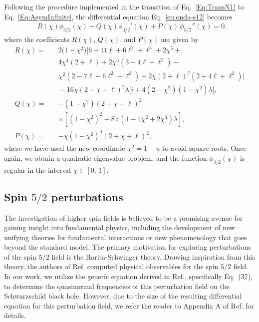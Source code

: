 Following the procedure implemented in the transition of Eq.~\eqref{Eq:TransN1} to Eq.~\eqref{Eq:AsymInfinite}, the differential equation Eq.~\eqref{eq:onda-s12} becomes
%
\begin{equation}\label{eq:onda-s32a}
  \begin{split}
    &R(\chi)\phi_{\scriptscriptstyle{3/2}}(\chi) + Q(\chi)\phi_{\scriptscriptstyle{3/2}}'(\chi) + P(\chi) \,\phi_{\scriptscriptstyle{3/2}}''(\chi)=0,
  \end{split}
\end{equation}
%
where the coefficients $R(\chi)$, $Q(\chi)$, and $P(\chi)$ are given by
%
\begin{eqnarray}
  R(\chi)=
  \,&& 2\big(1-\chi^2\big)\Big[6+11\ell+6\ell^2+\ell^3 +2\chi^5+  \nonumber\\
    &&4\chi^4(2+\ell) +2\chi^3\left(3+4\ell+\ell^2\right)- \nonumber\\
    &&\!\!\chi^2\left(2-7\ell-6\ell^2-\ell^3\right)  + 2\chi(2+\ell)^2\left(2+4\ell+\ell^2\right)\Big] \nonumber \\
  &&\! -16\chi(2+\chi+\ell)^2\lambda\Big[i + 4 \left(2-\chi^2\right)\left(1-\chi^2\right)\lambda\Big],\nonumber\\
  Q(\chi) = && -\left(1-\chi^2\right)\left(2+\chi+\ell\right)^2\nonumber\\
  && \times \left[\left(1-\chi^2\right)^2-8\,i\,(1-4\chi^2+2\chi^4)\lambda\right],\nonumber\\
  P(\chi)  =&&
  -\chi\left(1-\chi^2\right)^3\left(2+\chi+\ell\right)^2,\nonumber
\end{eqnarray}
%
where we have used the new coordinate $\chi^2=1-u$ to avoid square roots. Once again, we obtain a quadratic eigenvalue problem, and the function $\phi_{\scriptscriptstyle{3/2}}(\chi)$ is regular in the interval $\chi\in [0,\,1]$.

\subsection{Spin $5/2$ perturbations}

The investigation of higher spin fields is believed to be a promising avenue for gaining insight into fundamental physics, including the development of new unifying theories for fundamental interactions or new phenomenology that goes beyond the standard model. The primary motivation for exploring perturbations of the spin $5/2$ field is the Rarita-Schwinger theory. Drawing inspiration from this theory, the authors of Ref.\cite{Shklyar:2009cx} computed physical observables for the spin $5/2$ field. In our work, we utilize the generic equation derived in Ref.\cite{Shu:2005fw}, specifically Eq.~(37), to determine the quasinormal frequencies of this perturbation field on the Schwarzschild black hole. However, due to the size of the resulting differential equation for this perturbation field, we refer the reader to Appendix A of Ref.\cite{Mamani2022} for details.

